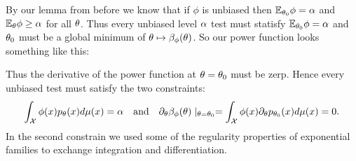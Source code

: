 By our lemma from before we know that if $\phi$ is unbiased then ${\mathbb{E}}_{{\theta}_0}\phi = {\alpha}$ and ${\mathbb{E}}_{\theta} \phi \ge {\alpha}$ for all ${\theta}$. Thus every unbiased level ${\alpha}$ test must statisfy ${\mathbb{E}}_{{\theta}_0}\phi={\alpha}$ and ${\theta}_0$ must be a global minimum of ${\theta} \mapsto \beta_\phi({\theta})$. So our power function looks something like this:



Thus the derivative of the power function at ${\theta}={\theta}_0$ must be zerp. Hence every unbiased test must satisfy the two constraints:
\begin{equation}
    \int_{\mathcal{X}} \phi(x) p_{\theta}(x)d\mu(x) = {\alpha} ~~~\text{and}~~~ \partial_{\theta} \beta_\phi({\theta})\mid_{{\theta} = {\theta}_0} = \int_{\mathcal{X}} \phi(x) \partial_{\theta} p_{{\theta}_0}(x)d\mu(x) =0.
\end{equation}
In the second constrain we used some of the regularity properties of exponential families to exchange integration and differentiation.

